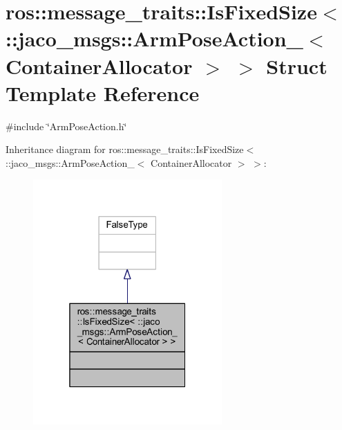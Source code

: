 \hypertarget{structros_1_1message__traits_1_1IsFixedSize_3_01_1_1jaco__msgs_1_1ArmPoseAction___3_01ContainerAllocator_01_4_01_4}{}\section{ros\+:\+:message\+\_\+traits\+:\+:Is\+Fixed\+Size$<$ \+:\+:jaco\+\_\+msgs\+:\+:Arm\+Pose\+Action\+\_\+$<$ Container\+Allocator $>$ $>$ Struct Template Reference}
\label{structros_1_1message__traits_1_1IsFixedSize_3_01_1_1jaco__msgs_1_1ArmPoseAction___3_01ContainerAllocator_01_4_01_4}


{\ttfamily \#include \char`\"{}Arm\+Pose\+Action.\+h\char`\"{}}



Inheritance diagram for ros\+:\+:message\+\_\+traits\+:\+:Is\+Fixed\+Size$<$ \+:\+:jaco\+\_\+msgs\+:\+:Arm\+Pose\+Action\+\_\+$<$ Container\+Allocator $>$ $>$\+:
\nopagebreak
\begin{figure}[H]
\begin{center}
\leavevmode
\includegraphics[width=205pt]{d9/d67/structros_1_1message__traits_1_1IsFixedSize_3_01_1_1jaco__msgs_1_1ArmPoseAction___3_01ContainerA9d53465821779e058b1248c7e9cb58a4}
\end{center}
\end{figure}


